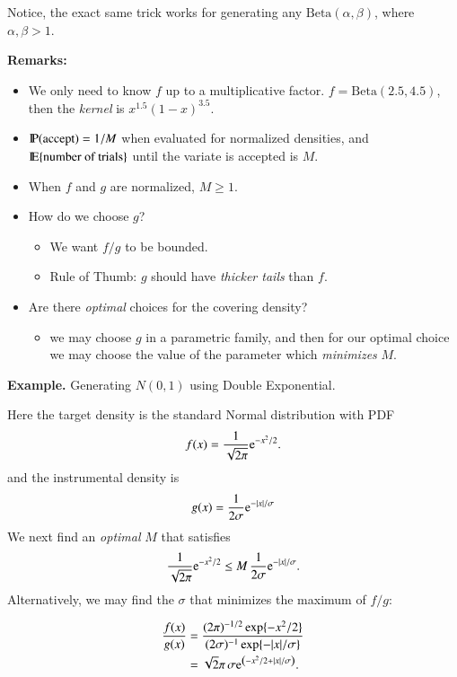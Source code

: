 \documentclass[captions=tableheading]{scrbook}
\begin{document}
Notice, the exact same trick works for generating any $\mathrm{Beta}(\alpha,\beta)$, where $\alpha,\beta>1$.

\textbf{Remarks:}

\begin{itemize}
\item We only need to know $f$ up to a multiplicative factor.
  $f=\mathrm{Beta}(2.5,4.5)$, then the \emph{kernel} is $x^{1.5}(1-x)^{3.5}$.
\item $\P(\mbox{accept})=1/M$ when evaluated for normalized densities, and \newline $\E\{\mbox{number of trials}\}$ until the variate is accepted is $M$.
\item When $f$ and $g$ are normalized, $M \geq 1$.
\item How do we choose $g$?
\begin{itemize}
\item We want $f/g$ to be bounded.
\item Rule of Thumb: $g$ should have \emph{thicker tails} than $f$.
\end{itemize}
\item Are there \emph{optimal} choices for the covering density?
\begin{itemize}
\item we may choose $g$ in a parametric family, and then for our optimal choice we may choose the value of the parameter which \emph{minimizes} $M$.
\end{itemize}
\end{itemize}
\textbf{Example.} Generating $N(0,1)$ using Double Exponential.

Here the target density is the standard Normal distribution with PDF
\[
f(x)=\frac{1}{\sqrt{2\pi}}\me^{-x^{2}/2}.
\]
and the instrumental density is 
\[
g(x)=\frac{1}{2\sigma}\me^{-|x|/\sigma}
\]
We next find an \emph{optimal} $M$ that satisfies 
\[
\frac{1}{\sqrt{2\pi}}\me^{-x^{2}/2}\leq M\,\frac{1}{2\sigma}\me^{-|x|/\sigma}.
\]
Alternatively, we may find the $\sigma$ that minimizes the maximum of $f/g$:

\begin{align*}
\frac{f(x)}{g(x)} & =\frac{(2\pi)^{-1/2}\exp\{-x^{2}/2\}}{(2\sigma)^{-1}\exp\{-|x|/\sigma\}}\\
 & =\sqrt{2}{\pi}\,\sigma \me^{\left(-x^{2}/2+|x|/\sigma\right)}.
\end{align*}
\end{document}
